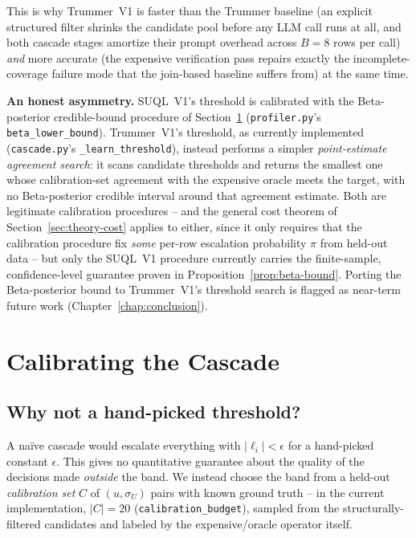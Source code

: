 This is why Trummer~V1 is faster than the Trummer baseline (an explicit
structured filter shrinks the candidate pool before any LLM call runs
at all, and both cascade stages amortize their prompt overhead across
$B=8$ rows per call) \emph{and} more accurate (the expensive
verification pass repairs exactly the incomplete-coverage failure mode
that the join-based baseline suffers from) at the same time.

\textbf{An honest asymmetry.} SUQL~V1's threshold is calibrated with the
Beta-posterior credible-bound procedure of Section~\ref{sec:beta-posterior}
(\texttt{profiler.py}'s \texttt{beta\_lower\_bound}). Trummer~V1's threshold,
as currently implemented (\texttt{cascade.py}'s \texttt{\_learn\_threshold}),
instead performs a simpler \emph{point-estimate agreement search}: it
scans candidate thresholds and returns the smallest one whose calibration-set
agreement with the expensive oracle meets the target, with no Beta-posterior
credible interval around that agreement estimate. Both are legitimate
calibration procedures -- and the general cost theorem of
Section~\ref{sec:theory-cost} applies to either, since it only requires
that the calibration procedure fix \emph{some} per-row escalation
probability $\pi$ from held-out data -- but only the SUQL~V1 procedure
currently carries the finite-sample, confidence-level guarantee proven in
Proposition~\ref{prop:beta-bound}. Porting the Beta-posterior bound to
Trummer~V1's threshold search is flagged as near-term future work
(Chapter~\ref{chap:conclusion}).

\section{Calibrating the Cascade}
\label{sec:beta-posterior}

\subsection{Why not a hand-picked threshold?}
A na\"ive cascade would escalate everything with $|\ell_i| < \epsilon$
for a hand-picked constant $\epsilon$. This gives no quantitative
guarantee about the quality of the decisions made \emph{outside} the
band. We instead choose the band from a held-out \emph{calibration set}
$C$ of $(u, \sigma_U)$ pairs with known ground truth -- in the current
implementation, $|C|=20$ (\texttt{calibration\_budget}), sampled from the
structurally-filtered candidates and labeled by the expensive/oracle
operator itself.

